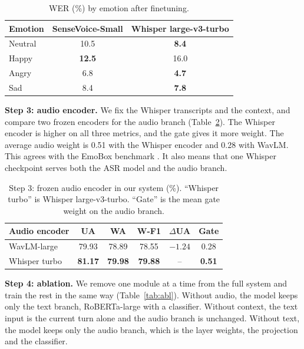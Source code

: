 \documentclass[conference]{IEEEtran}
\newcommand{\tabstyle}{\footnotesize\setlength{\tabcolsep}{3.5pt}}
\begin{document}
\begin{table}[!t]
\centering
\caption{WER (\%) by emotion after finetuning.}
\label{tab:werEmo}
\tabstyle
\begin{tabular}{lcc}
\toprule
Emotion & SenseVoice-Small & Whisper large-v3-turbo \\
\midrule
Neutral & 10.5 & \textbf{8.4} \\
Happy & \textbf{12.5} & 16.0 \\
Angry & 6.8 & \textbf{4.7} \\
Sad & 8.4 & \textbf{7.8} \\
\bottomrule
\end{tabular}
\end{table}

\textbf{Step 3: audio encoder.} We fix the Whisper transcripts and the context, and compare two frozen encoders for
the audio branch (Table~\ref{tab:enc}). The Whisper encoder is higher on all three metrics, and the gate gives it
more weight. The average audio weight is 0.51 with the Whisper encoder and 0.28 with WavLM. This agrees with the EmoBox
benchmark \cite{ma2024emobox}. It also means that one Whisper checkpoint serves both the ASR model and the audio
branch.

\begin{table}[!t]
\centering
\caption{Step 3: frozen audio encoder in our system (\%). ``Whisper turbo'' is Whisper large-v3-turbo. ``Gate'' is the mean gate weight on the audio branch.}
\label{tab:enc}
\tabstyle
\begin{tabular}{lccccc}
\toprule
Audio encoder & UA & WA & W-F1 & $\Delta$UA & Gate \\
\midrule
WavLM-large \cite{chen2022wavlm} & 79.93 & 78.89 & 78.55 & $-1.24$ & 0.28 \\
Whisper turbo & \textbf{81.17} & \textbf{79.98} & \textbf{79.88} & -- & \textbf{0.51} \\
\bottomrule
\end{tabular}
\end{table}

\textbf{Step 4: ablation.} We remove one module at a time from the full system and train the rest in the same way
(Table~\ref{tab:abl}). Without audio, the model keeps only the text branch, RoBERTa-large with a classifier. Without context, the text input is the current turn alone and the audio branch is unchanged. Without text, the model keeps only the audio branch, which is the layer weights, the projection and the classifier.
\end{document}
